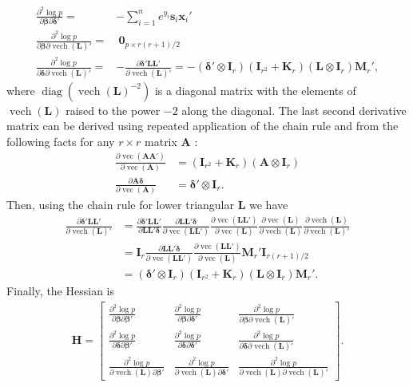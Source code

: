 \documentclass[12pt]{article}
\DeclareMathOperator{\vect}{vec}
\DeclareMathOperator{\vech}{vech}
\DeclareMathOperator{\diag}{diag}
\begin{document}
\begin{appendix}
\begin{align*}
\frac{\partial^2 \log p}{\partial \bm{\beta} \partial \bm{\delta}'} =& -\sum_{i=1}^ne^{y_i}\bm{s}_i\bm{x}_i'\\
\frac{\partial^2 \log p}{\partial \bm{\beta} \partial \vech(\bm{L})'} =&\  \bm{0}_{p\times r(r+1)/2}\\
\frac{\partial^2 \log p}{\partial \bm{\delta} \partial \vech(\bm{L})'} =&-\frac{\partial \bm{\delta}'\bm{L}\bm{L}'}{\partial \vech(\bm{L})'} =  -(\bm{\delta}' \otimes \bm{I}_r)(\bm{I}_{r^2} + \bm{K}_r)(\bm{L}\otimes \bm{I}_r) \bm{M}_r',
\end{align*}
where $\diag(\vech(\bm{L})^{-2})$ is a diagonal matrix with the elements of $\vech(\bm{L})$ raised to the power $-2$ along the diagonal. The last second derivative matrix can be derived using repeated application of the chain rule and from the following facts for any $r\times r$ matrix $\bm{A}$ \citep{magnus2007matrix}:
\begin{align*}
\frac{\partial \vect(\bm{A}\bm{A}')}{\partial \vect(\bm{A})} & = (\bm{I}_{r^2} + \bm{K}_r)(\bm{A}\otimes \bm{I}_r)\\
\frac{\partial \bm{A}\bm{\delta}}{\partial \vect(\bm{A})}& = \bm{\delta}' \otimes \bm{I}_r.
\end{align*}
Then, using the chain rule for lower triangular $\bm{L}$ we have
\begin{align*}
\frac{\partial \bm{\delta}'\bm{L}\bm{L'}}{\partial\vech(\bm{L})'} &= \frac{\partial \bm{\delta}'\bm{L}\bm{L'}}{\partial \bm{L}\bm{L}'\bm{\delta}} \frac{\partial \bm{L}\bm{L}'\bm{\delta}}{\partial \vect(\bm{L}\bm{L}')} \frac{\partial \vect(\bm{L}\bm{L}')}{\partial \vect(\bm{L})}\frac{\partial \vect(\bm{L})}{\partial \vech(\bm{L})}\frac{\partial \vech(\bm{L})}{\partial \vech(\bm{L})'}\\
&= \bm{I}_r \frac{\partial \bm{L}\bm{L}'\bm{\delta}}{\partial \vect(\bm{L}\bm{L}')} \frac{\partial \vect(\bm{L}\bm{L}')}{\partial \vect(\bm{L})} \bm{M}_r'\bm{I}_{r(r+1)/2}\\
&= (\bm{\delta}' \otimes \bm{I}_r)(\bm{I}_{r^2} + \bm{K}_r)(\bm{L}\otimes \bm{I}_r) \bm{M}_r'.
\end{align*}
Finally, the Hessian is
\begin{align*}
\bm{H} = \begin{bmatrix} \frac{\partial^2 \log p}{\partial \bm{\beta} \partial \bm{\beta}'} & \frac{\partial^2 \log p}{\partial \bm{\beta} \partial \bm{\delta} '} & \frac{\partial^2 \log p}{\partial \bm{\beta} \partial \vech(\bm{L}) '}\\
\frac{\partial^2 \log p}{\partial \bm{\delta} \partial \bm{\beta}'}  & \frac{\partial^2 \log p}{ \partial \bm{\delta} \partial \bm{\delta}'} & \frac{\partial^2 \log p}{ \partial \bm{\delta} \partial \vech(\bm{L})'}\\
\frac{\partial^2 \log p}{\partial \vech(\bm{L}) \partial \bm{\beta}'} & \frac{\partial^2 \log p}{ \partial \vech(\bm{L}) \partial \bm{\delta}'} & \frac{\partial^2 \log p}{\partial \vech(\bm{L}) \partial \vech(\bm{L})'} 
\end{bmatrix}.
\end{align*}
\end{appendix}
\end{document}
